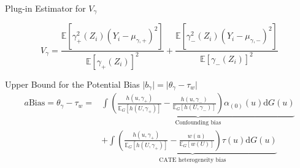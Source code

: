  \begin{frame}{Plug-in Estimator for $V_{\gamma}$}

    $$
    V_{\gamma}=\frac{\mathbb{E}\left[\gamma_{+}^{2}\left(Z_{i}\right)\left(Y_{i}-\mu_{\gamma,+}\right)^{2}\right]}{\mathbb{E}\left[\gamma_{+}\left(Z_{i}\right)\right]^{2}}+\frac{\mathbb{E}\left[\gamma_{-}^{2}\left(Z_{i}\right)\left(Y_{i}-\mu_{\gamma,-}\right)^{2}\right]}{\mathbb{E}\left[\gamma_{-}\left(Z_{i}\right)\right]^{2}}
    $$
 \end{frame}

 \begin{frame}{Upper Bound for the Potential Bias $ \lvert b_{\gamma} \rvert = \lvert \theta_{\gamma}-\tau_{w} \rvert$}
    \begin{align*}
        a\mathrm{Bias}=\theta_{\gamma}-\tau_{w}=&\underbrace{\int\left(\frac{h\left(u,\gamma_{+}\right)}{\mathbb{E}_{G}\left[h\left(U,\gamma_{+}\right)\right]}-\frac{h\left(u,\gamma_{-}\right)}{\mathbb{E}_{G}\left[h\left(U,\gamma_{-}\right)\right]}\right)\alpha_{\left(0\right)}\left(u\right)\mathrm{d}G\left(u\right)}_{\text{Confounding bias}}\\
        &+\underbrace{\int\left(\frac{h\left(u,\gamma_{+}\right)}{\mathbb{E}_{G}\left[h\left(U,\gamma_{+}\right)\right]}-\frac{w\left(u\right)}{\mathbb{E}_{G}\left[w\left(U\right)\right]}\right)\tau\left(u\right)\mathrm{d}G\left(u\right)}_{\text{CATE heterogeneity bias}}
    \end{align*}

    
 \end{frame}


